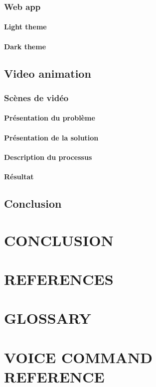 \subsection{Web app}
\subsubsection{Light theme}
\subsubsection{Dark theme}

\section{Video animation}
\subsection{Scènes de vidéo}
\subsubsection{Présentation du problème}
\subsubsection{Présentation de la solution}
\subsubsection{Description du processus}
\subsubsection{Résultat}

\section{Conclusion}

\chapter*{CONCLUSION}

\appendix
\chapter{REFERENCES}
\chapter{GLOSSARY}
\chapter{VOICE COMMAND REFERENCE}

